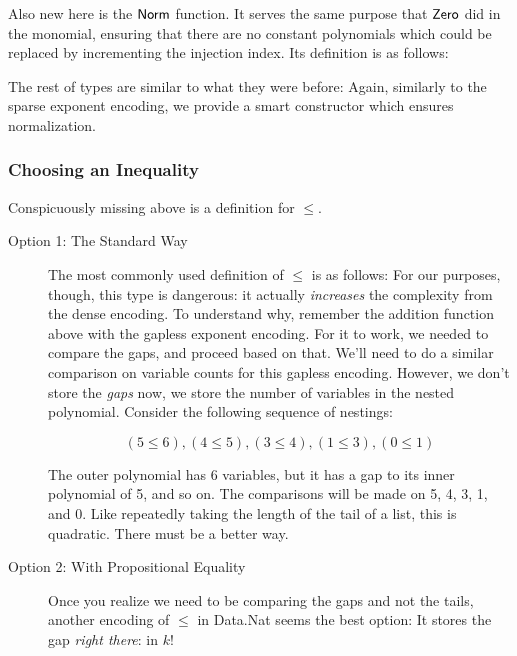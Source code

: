 \documentclass[draft, twocolumn]{article}
\theoremstyle{definition}
\theoremstyle{remark}
\begin{document}
Also new here is the \(\AgdaFunction{Norm}\) function. It serves the same
purpose that \(\AgdaFunction{Zero}\) did in the monomial, ensuring that there
are no constant polynomials which could be replaced by incrementing the
injection index. Its definition is as follows:

The rest of types are similar to what they were before:
Again, similarly to the sparse exponent encoding, we provide a smart
constructor which ensures normalization.
\subsubsection{Choosing an Inequality}
Conspicuously missing above is a definition for \(\leq\).
\begin{description}
  \item[Option 1: The Standard Way] The most commonly used definition of
    \(\leq\) is as follows:
    For our purposes, though, this type is dangerous: it actually
    \emph{increases} the complexity from the dense encoding. To understand why,
    remember the addition function above with the gapless exponent encoding. For
    it to work, we needed to compare the gaps, and proceed based on that. We'll
    need to do a similar comparison on variable counts for this gapless
    encoding. However, we don't store the \emph{gaps} now, we store the number
    of variables in the nested polynomial. Consider the following sequence of
    nestings:

    \[ (5 ≤ 6), (4 ≤ 5), (3 ≤ 4), (1 ≤ 3), (0 ≤ 1) \]

    The outer polynomial has 6 variables, but it has a gap to its inner
    polynomial of 5, and so on. The comparisons will be made on 5, 4, 3, 1, and
    0. Like repeatedly taking the length of the tail of a list, this is
    quadratic. There must be a better way.
  \item[Option 2: With Propositional Equality] Once you realize we need to be
    comparing the gaps and not the tails, another encoding of \(\leq\) in
    Data.Nat seems the best option:
    It stores the gap \emph{right there}: in \(k\)!


\end{description}
\end{document}

